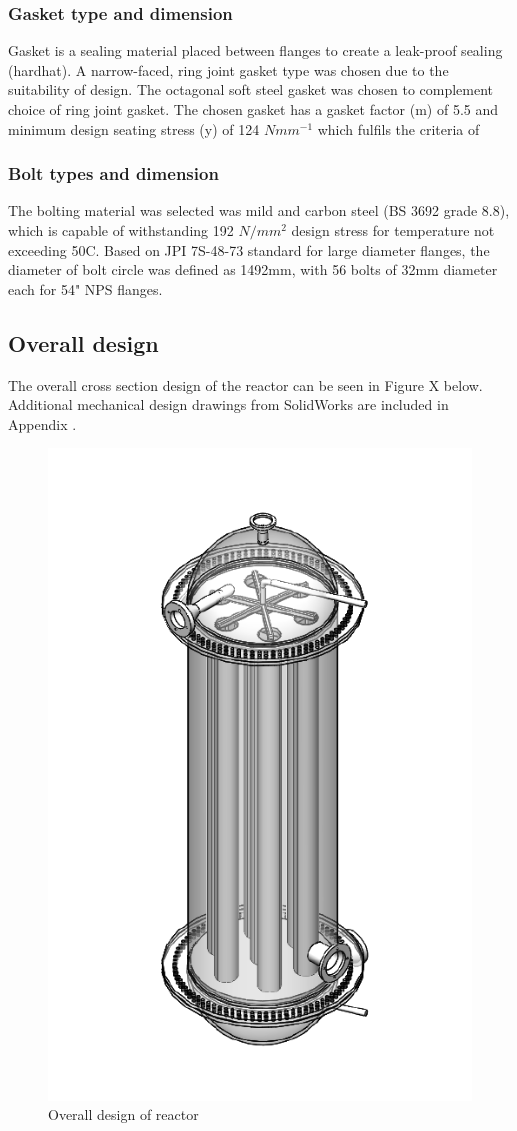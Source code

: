 \subsubsection{Gasket type and dimension}
Gasket is a sealing material placed between flanges to create a leak-proof sealing (hardhat). A narrow-faced, ring joint gasket type was chosen due to the suitability of design. The octagonal soft steel gasket was chosen to complement choice of ring joint gasket. The chosen gasket has a gasket factor (m) of 5.5 and minimum design seating stress (y) of 124 $Nmm^{-1}$ which fulfils the criteria of

\subsubsection{Bolt types and dimension}
The bolting material was selected was mild and carbon steel (BS 3692 grade 8.8), which is capable of withstanding 192 $N/mm^2$ design stress for temperature not exceeding 50C. Based on JPI 7S-48-73 standard for large diameter flanges, the diameter of bolt circle was defined as 1492mm, with 56 bolts of 32mm diameter each for 54" NPS flanges. 

\subsection{Overall design}
The overall cross section design of the reactor can be seen in Figure X below. Additional mechanical design drawings from SolidWorks are included in Appendix .
\begin{figure}[H]
    \centering
    \includegraphics[width=0.49\linewidth]{chapters/2-reaction/figures/FYD reactor main photo.PNG}
    \caption{Overall design of reactor}
    \label{fig:mainreactor}
\end{figure}

